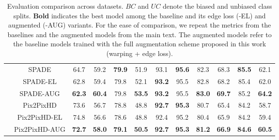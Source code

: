 \documentclass[final]{cvpr}
\newcommand\+{\mkern4mu}
\begin{document}
\begin{table*}[h]
{\begin{tabular}{@{}lc@{\hspace{0.3cm}}c@{\hspace{0.7cm}}ccc@{\hspace{0.7cm}}ccc@{\hspace{0.7cm}}ccc@{}}
			& \small SPADE & \small 64.7 & \small 59.2 & \small \textbf{79.9} & \small 51.9 & \small 93.1 & \small \textbf{95.6} & \small 82.3 & \small 68.3 & \small \textbf{85.5} & \small 62.1 \tabularnewline
			& \small SPADE-EL & \small 62.8 & \small 59.4 & \small 79.8 & \small 52.1 & \small \textbf{93.2} & \small 95.5 & \small 82.8 & \small 68.2 & \small 85.4 & \small 62.0 \tabularnewline
			& \small SPADE-AUG & \small \textbf{62.3} & \small \textbf{60.4} & \small 79.8 & \small \textbf{53.5} & \small \textbf{93.2} & \small 95.5 & \small \textbf{83.0} & \small \textbf{69.7} & \small 85.2 & \small \textbf{64.2} \tabularnewline[0.2cm] 
			
			& \small Pix2PixHD & \small 73.6& \small 56.7& \small 78.8& \small 48.8 & \small \textbf{92.7} & \small \textbf{95.3} & \small 80.7 & \small 65.4 & \small 84.2 & \small 58.7 \tabularnewline
			& \small Pix2PixHD-EL & \small 74.8 & \small 56.6 & \small 78.6 & \small 48.8 & \small 92.4 & \small 95.2 & \small 80.4 & \small 65.9 & \small 84.2 & \small 59.4 \tabularnewline	
			& \small Pix2PixHD-AUG & \small \textbf{72.7} & \small \textbf{58.0} & \small \textbf{79.1} & \small \textbf{50.5} & \small \textbf{92.7} & \small \textbf{95.3} & \small \textbf{81.2} & \small \textbf{66.9} & \small \textbf{84.6} & \small \textbf{60.5} \tabularnewline 
		\end{tabular}}
		\vspace{0.5em}
		\caption{Evaluation comparison across datasets. ${BC}$ and ${UC}$ denote the biased and unbiased class splits. \textbf{Bold} indicates the best model among the baseline and its edge loss (-EL) and augmented (-AUG) variants. For the ease of comparison, we repeat the metrics from the baselines and the augmented models from the main text. The augmented models refer to the baseline models trained with the full augmentation scheme proposed in this work (warping + edge loss).}
		\label{tab:aug_full}
\end{table*}
 
\end{document}

